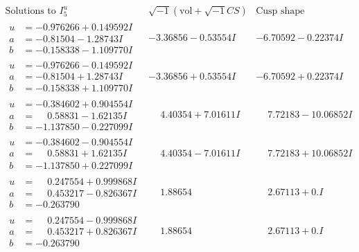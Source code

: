\documentclass[1p]{elsarticle_modified}
\theoremstyle{definition}
\newcommand{\I}{\sqrt{-1}}
\begin{document}
$$\begin{array}{c|c|c}  
\text{Solutions to }I^u_{5}& \I (\text{vol} + \sqrt{-1}CS) & \text{Cusp shape}\\
 \hline 
\begin{aligned}
u &= -0.976266 + 0.149592 I \\
a &= -0.81504 - 1.28743 I \\
b &= -0.158338 - 1.109770 I\end{aligned}
 & -3.36856 - 0.53554 I & -6.70592 - 0.22374 I \\ \hline\begin{aligned}
u &= -0.976266 - 0.149592 I \\
a &= -0.81504 + 1.28743 I \\
b &= -0.158338 + 1.109770 I\end{aligned}
 & -3.36856 + 0.53554 I & -6.70592 + 0.22374 I \\ \hline\begin{aligned}
u &= -0.384602 + 0.904554 I \\
a &= \phantom{-}0.58831 - 1.62135 I \\
b &= -1.137850 - 0.227099 I\end{aligned}
 & \phantom{-}4.40354 + 7.01611 I & \phantom{-}7.72183 - 10.06852 I \\ \hline\begin{aligned}
u &= -0.384602 - 0.904554 I \\
a &= \phantom{-}0.58831 + 1.62135 I \\
b &= -1.137850 + 0.227099 I\end{aligned}
 & \phantom{-}4.40354 - 7.01611 I & \phantom{-}7.72183 + 10.06852 I \\ \hline\begin{aligned}
u &= \phantom{-}0.247554 + 0.999868 I \\
a &= \phantom{-}0.453217 - 0.826367 I \\
b &= -0.263790\phantom{ +0.000000I}\end{aligned}
 & \phantom{-}1.88654\phantom{ +0.000000I} & \phantom{-}2.67113 + 0. I\phantom{ +0.000000I} \\ \hline\begin{aligned}
u &= \phantom{-}0.247554 - 0.999868 I \\
a &= \phantom{-}0.453217 + 0.826367 I \\
b &= -0.263790\phantom{ +0.000000I}\end{aligned}
 & \phantom{-}1.88654\phantom{ +0.000000I} & \phantom{-}2.67113 + 0. I\phantom{ +0.000000I} \\ \hline\begin{aligned}

\end{aligned}
\end{array}$$
\end{document}

